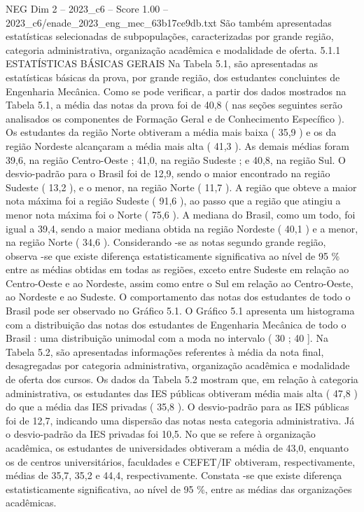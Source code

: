 \begin{textsample}{NEG Dim 2 – 2023\_c6 – Score 1.00 – 2023\_c6/enade\_2023\_eng\_mec\_63b17ce9db.txt}
São também apresentadas estatísticas selecionadas de subpopulações, caracterizadas por grande região, categoria administrativa, organização acadêmica e modalidade de oferta. 5.1.1 ESTATÍSTICAS BÁSICAS GERAIS Na Tabela 5.1, são apresentadas as estatísticas básicas da prova, por grande região, dos estudantes concluintes de Engenharia Mecânica.
Como se pode verificar, a partir dos dados mostrados na Tabela 5.1, a média das notas da prova foi de 40,8 ( nas seções seguintes serão analisados os componentes de Formação Geral e de Conhecimento Específico ).
Os estudantes da região Norte obtiveram a média mais baixa ( 35,9 ) e os da região Nordeste alcançaram a média mais alta ( 41,3 ).
As demais médias foram 39,6, na região Centro-Oeste ; 41,0, na região Sudeste ; e 40,8, na região Sul.
O desvio-padrão para o Brasil foi de 12,9, sendo o maior encontrado na região Sudeste ( 13,2 ), e o menor, na região Norte ( 11,7 ).
A região que obteve a maior nota máxima foi a região Sudeste ( 91,6 ), ao passo que a região que atingiu a menor nota máxima foi o Norte ( 75,6 ).
A mediana do Brasil, como um todo, foi igual a 39,4, sendo a maior mediana obtida na região Nordeste ( 40,1 ) e a menor, na região Norte ( 34,6 ).
Considerando -se as notas segundo grande região, observa -se que existe diferença estatisticamente significativa ao nível de 95 \% entre as médias obtidas em todas as regiões, exceto entre Sudeste em relação ao Centro-Oeste e ao Nordeste, assim como entre o Sul em relação ao Centro-Oeste, ao Nordeste e ao Sudeste.
O comportamento das notas dos estudantes de todo o Brasil pode ser observado no Gráfico 5.1.
O Gráfico 5.1 apresenta um histograma com a distribuição das notas dos estudantes de Engenharia Mecânica de todo o Brasil : uma distribuição unimodal com a moda no intervalo ( 30 ; 40 ].
Na Tabela 5.2, são apresentadas informações referentes à média da nota final, desagregadas por categoria administrativa, organização acadêmica e modalidade de oferta dos cursos.
Os dados da Tabela 5.2 mostram que, em relação à categoria administrativa, os estudantes das IES públicas obtiveram média mais alta ( 47,8 ) do que a média das IES privadas ( 35,8 ).
O desvio-padrão para as IES públicas foi de 12,7, indicando uma dispersão das notas nesta categoria administrativa.
Já o desvio-padrão da IES privadas foi 10,5.
No que se refere à organização acadêmica, os estudantes de universidades obtiveram a média de 43,0, enquanto os de centros universitários, faculdades e CEFET/IF obtiveram, respectivamente, médias de 35,7, 35,2 e 44,4, respectivamente.
Constata -se que existe diferença estatisticamente significativa, ao nível de 95 \%, entre as médias das organizações acadêmicas.

\end{textsample}
